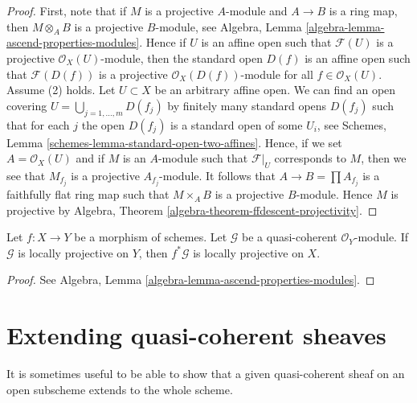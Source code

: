 \begin{proof}
First, note that if $M$ is a projective $A$-module and $A \to B$ is a
ring map, then $M \otimes_A B$ is a projective $B$-module, see
Algebra, Lemma \ref{algebra-lemma-ascend-properties-modules}.
Hence if $U$ is an affine open such that $\mathcal{F}(U)$ is a projective
$\mathcal{O}_X(U)$-module, then the standard open $D(f)$ is an
affine open such that $\mathcal{F}(D(f))$ is a projective
$\mathcal{O}_X(D(f))$-module for all $f \in \mathcal{O}_X(U)$.
Assume (2) holds. Let $U \subset X$ be an arbitrary affine open.
We can find an open covering $U = \bigcup_{j = 1, \ldots, m} D(f_j)$
by finitely many standard opens $D(f_j)$ such that for each
$j$ the open $D(f_j)$ is a standard open of some $U_i$, see
Schemes, Lemma \ref{schemes-lemma-standard-open-two-affines}.
Hence, if we set $A = \mathcal{O}_X(U)$ and if $M$ is an $A$-module
such that $\mathcal{F}|_U$ corresponds to $M$, then we see that
$M_{f_j}$ is a projective $A_{f_j}$-module. It follows that
$A \to B = \prod A_{f_j}$ is a faithfully flat ring map
such that $M \times_A B$ is a projective $B$-module.
Hence $M$ is projective by
Algebra, Theorem \ref{algebra-theorem-ffdescent-projectivity}.
\end{proof}

\begin{lemma}
\label{lemma-locally-projective-pullback}
Let $f : X \to Y$ be a morphism of schemes.
Let $\mathcal{G}$ be a quasi-coherent $\mathcal{O}_Y$-module.
If $\mathcal{G}$ is locally projective on $Y$, then $f^*\mathcal{G}$
is locally projective on $X$.
\end{lemma}

\begin{proof}
See
Algebra, Lemma \ref{algebra-lemma-ascend-properties-modules}.
\end{proof}






\section{Extending quasi-coherent sheaves}
\label{section-extending-quasi-coherent-sheaves}

\noindent
It is sometimes useful to be able to show that a given quasi-coherent
sheaf on an open subscheme extends to the whole scheme.

